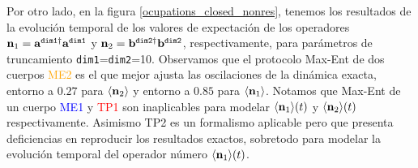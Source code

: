 \documentclass{report} %
\numberwithin{equation}{section}
\begin{document}
Por otro lado, en la figura \ref{ocupations_closed_nonres}, tenemos los resultados de la evolución temporal de los valores de expectación de los operadores ${\bf n}_1 = {\bf a}^{\texttt{dim1}\dagger} {\bf a}^{\texttt{dim1}}$ y ${\bf n}_2 = {\mathbf b}^{\texttt{dim2}\dagger} {\mathbf b}^{\texttt{dim2}}$, respectivamente, para parámetros de truncamiento \texttt{dim1}=\texttt{dim2}=10. 
Observamos que el protocolo Max-Ent de dos cuerpos \textcolor{orange}{ME2} es el que mejor ajusta las oscilaciones de la dinámica exacta, entorno a $0.27$ para $\langle{\bf n}_2\rangle$ y entorno a $0.85$ para $\langle{\bf n}_1\rangle$.
Notamos que Max-Ent de un cuerpo \textcolor{blue}{ME1} y \textcolor{red}{TP1} son inaplicables para modelar $\langle{\bf n}_1\rangle(t)$ y $\langle{\bf n}_2\rangle(t)$  respectivamente. Asimismo \textcolor{dark green}{TP2} es un formalismo aplicable pero que presenta deficiencias en reproducir los resultados exactos, sobretodo para modelar la evolución temporal del operador número $\langle{\bf n}_1\rangle(t)$. \\
\end{document}

